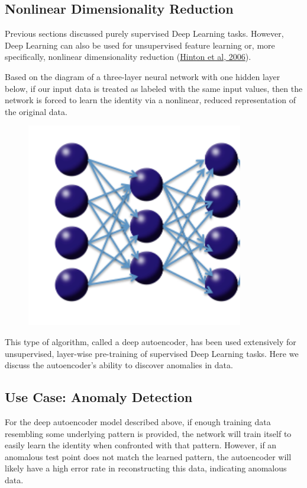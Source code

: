 {{\subsection{Nonlinear Dimensionality Reduction} 
Previous sections discussed purely supervised Deep Learning tasks. However, Deep Learning can also be used for unsupervised feature learning or, more specifically, nonlinear dimensionality reduction  (\href{http://www.cs.toronto.edu/~hinton/science.pdf}{Hinton et al, 2006}). 

Based on the diagram of a three-layer neural network with one hidden layer below, if our input data is treated as labeled with the same input values, then the network is forced to learn the identity via a nonlinear, reduced representation of the original data. 

\begin{figure}[h!]
\centering
\includegraphics[scale=0.6]{autoencoder.png}
\end{figure}

This type of algorithm, called a deep autoencoder, has been used extensively for unsupervised, layer-wise pre-training of supervised Deep Learning tasks. Here we discuss the autoencoder's ability to discover anomalies in data. 



\subsection{Use Case: Anomaly Detection} %
For the deep autoencoder model described above, if enough training data resembling some underlying pattern is provided, the network will train itself to easily learn the identity when confronted with that pattern. However, if an anomalous test point does not match the learned pattern, the autoencoder will likely have a high error rate in reconstructing this data, indicating anomalous data.

}}
